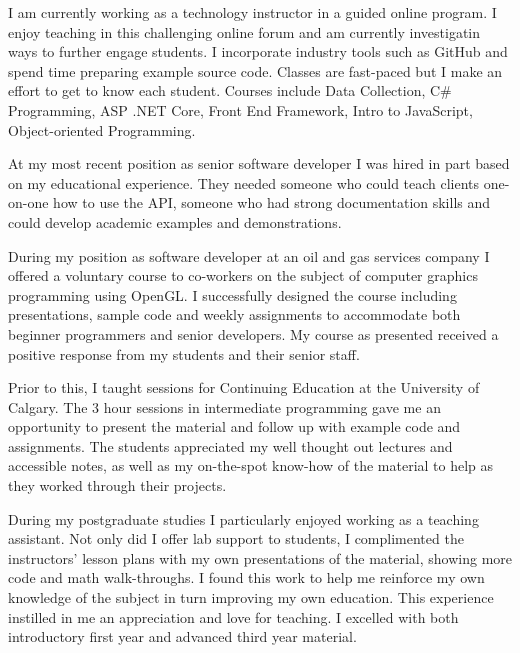 \begin{minipage}[t]{\textwidth} %
	\vspace{-\baselineskip} %
\begin{entrylist}
	\entry
{}
{}
{}
{I am currently working as a technology instructor in a guided online program. I enjoy teaching in this challenging online forum and am currently investigatin ways to further engage students. I incorporate industry tools such as GitHub and spend time preparing example source code. Classes are fast-paced but I make an effort to get to know each student. Courses include Data Collection, C\# Programming, ASP .NET Core, Front End Framework, Intro to JavaScript, Object-oriented Programming.}
\end{entrylist}
\begin{entrylist}
	\entry
{}
{}
{}
{At my most recent position as senior software developer I was hired in part based on my educational experience. They needed someone who could teach clients one-on-one how to use the API, someone who had strong documentation skills and could develop academic examples and demonstrations.}
\end{entrylist}
\begin{entrylist}
	\entry
{}
{}
{}
{During my position as software developer at an oil and gas services company I
offered a voluntary course to co-workers on the subject of computer graphics programming
using OpenGL. I successfully designed the course including presentations, sample code and
weekly assignments to accommodate both beginner programmers and senior developers. My
course as presented received a positive response from my students and their senior staff.}
\end{entrylist}
\begin{entrylist}
	\entry
{}
{}
{}
{Prior to this, I taught sessions for Continuing Education at the University of Calgary. The 3 hour
sessions in intermediate programming gave me an opportunity to present the material and
follow up with example code and assignments. The students appreciated my well thought out
lectures and accessible notes, as well as my on-the-spot know-how of the material to help as
they worked through their projects.}
\end{entrylist}
\begin{entrylist}
	\entry
{}
{}
{}
{During my postgraduate studies I particularly enjoyed working as a teaching assistant. Not only
did I offer lab support to students, I complimented the instructors’ lesson plans with my own
presentations of the material, showing more code and math walk-throughs. I found this work to
help me reinforce my own knowledge of the subject in turn improving my own education. This
experience instilled in me an appreciation and love for teaching. I excelled with both introductory
first year and advanced third year material.}
\end{entrylist}
\end{minipage}
